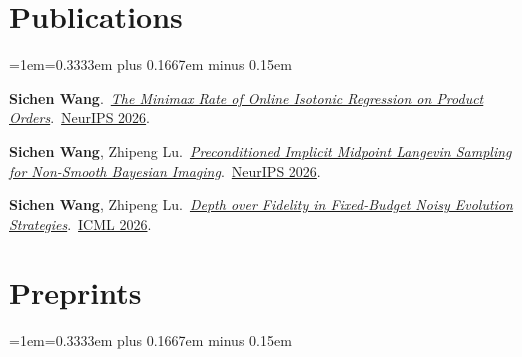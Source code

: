 \documentclass[letterpaper, 10.5pt]{article}
\newlength{\pubgap}\setlength{\pubgap}{0.3em}
\newlength{\secgap}\setlength{\secgap}{0.5em}
\begin{document}
\begin{minipage}[t]{0.68\textwidth}

\section{Publications}
\begingroup
{}\relax{}\relax{}\relax\emergencystretch=1em\relax\spaceskip=0.3333em plus 0.1667em minus 0.15em\relax

\textbf{Sichen Wang}.\ \href{https://sichenwang.com/publications/online-isotonic-regression/}{\textit{The Minimax Rate of Online Isotonic Regression on Product Orders}}.\ \href{https://openreview.net/forum?id=OZYmFCFi3w}{\textcolor{VenueColor}{NeurIPS 2026}}.
\par\vspace{\pubgap}
\textbf{Sichen Wang}, Zhipeng Lu.\ \href{https://sichenwang.com/publications/implicit-midpoint-langevin/}{\textit{Preconditioned Implicit Midpoint Langevin Sampling for Non-Smooth Bayesian Imaging}}.\ \href{https://openreview.net/forum?id=6vWdtoSoVB}{\textcolor{VenueColor}{NeurIPS 2026}}.
\par\vspace{\pubgap}
\textbf{Sichen Wang}, Zhipeng Lu.\ \href{https://sichenwang.com/publications/depth-over-fidelity/}{\textit{Depth over Fidelity in Fixed-Budget Noisy Evolution Strategies}}.\ \href{https://proceedings.mlr.press/v306/wang26ff.html}{\textcolor{VenueColor}{ICML 2026}}.

\endgroup

\vspace*{\secgap}
\section{Preprints}
\begingroup
{}\relax{}\relax{}\relax\emergencystretch=1em\relax\spaceskip=0.3333em plus 0.1667em minus 0.15em\relax


\end{minipage}
\end{document}
